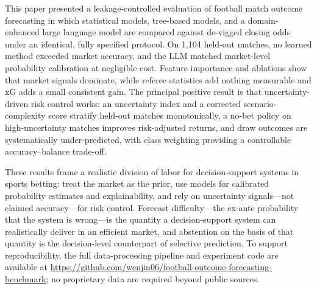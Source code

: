 \label{sec:conclusion}
This paper presented a leakage-controlled evaluation of football match
outcome forecasting in which statistical models, tree-based models,
and a domain-enhanced large language model are compared against
de-vigged closing odds under an identical, fully specified protocol.
On 1,104 held-out matches, no learned method exceeded market
accuracy, and the LLM matched market-level probability calibration
at negligible cost. Feature importance and ablations show that market
signals dominate, while referee statistics add nothing measurable
and xG adds a small consistent gain. The principal positive result
is that uncertainty-driven risk control works: an uncertainty index
and a corrected scenario-complexity score stratify held-out matches
monotonically, a no-bet policy on high-uncertainty matches improves
risk-adjusted returns, and draw outcomes are systematically
under-predicted, with class weighting providing a controllable
accuracy--balance trade-off.

These results frame a realistic division of labor for
decision-support systems in sports betting: treat the market as the
prior, use models for calibrated probability estimates and
explainability, and rely on uncertainty signals---not claimed
accuracy---for risk control. Forecast difficulty---the ex-ante
probability that the system is wrong---is the quantity a
decision-support system can realistically deliver in an efficient
market, and abstention on the basis of that quantity is the
decision-level counterpart of selective prediction. To support
reproducibility, the full
data-processing pipeline and experiment code are available at
\url{https://github.com/wenjin06/football-outcome-forecasting-benchmark};
no proprietary data are required beyond public sources.
